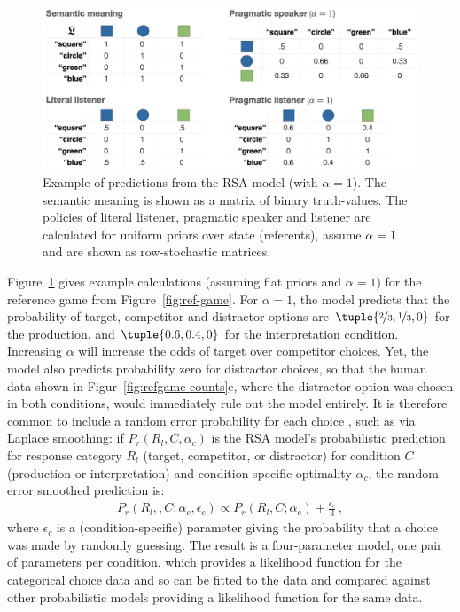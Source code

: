 \documentclass[fleqn]{article}
\begin{document}
\begin{figure}
  \centering
  \includegraphics[width = 0.9 \textwidth]{00-pics/RSA-example.png}
  \caption{
    Example of predictions from the RSA model (with $\alpha=1$).
    The semantic meaning is shown as a matrix of binary truth-values.
    The policies of literal listener, pragmatic speaker and listener are calculated for uniform priors over state (referents), assume $\alpha=1$ and are shown as row-stochastic matrices.
  }
  \label{fig:RSA-example}
\end{figure}

Figure~\ref{fig:RSA-example} gives example calculations (assuming flat priors and $\alpha=1$) for the reference game from Figure~\ref{fig:ref-game}.
For $\alpha=1$, the model predicts that the probability of target, competitor and distractor options are $\tuple{\nicefrac{2}{3}, \nicefrac{1}{3}, 0}$ for the production, and $\tuple{0.6, 0.4, 0}$ for the interpretation condition.
Increasing $\alpha$ will increase the odds of target over competitor choices.
Yet, the model also predicts probability zero for distractor choices, so that the human data shown in Figur~\ref{fig:refgame-counts}e, where the distractor option was chosen in both conditions, would immediately rule out the model entirely.
It is therefore common to include a random error probability for each choice \citep[e.g.,][]{LeeWagenmakers2013:Bayesian-Cognit}, such as via Laplace smoothing: if $P_{r}(R_{l}, C, \alpha_{c})$ is the RSA model's probabilistic prediction for response category $R_{l}$ (target, competitor, or distractor) for condition $C$ (production or interpretation) and condition-specific optimality $\alpha_{c}$, the random-error smoothed prediction is:
\begin{align*}
  P_{r}(R_{l}, , C; \alpha_{c}, \epsilon_{c}) \propto P_{r}(R_{l}, C; \alpha_{c}) +  \frac{\epsilon_{c}}{3}\,,
\end{align*}
where $\epsilon_{c}$ is a (condition-specific) parameter giving the probability that a choice was made by randomly guessing.
The result is a four-parameter model, one pair of parameters per condition, which provides a likelihood function for the categorical choice data and so can be fitted to the data and compared against other probabilistic models providing a likelihood function for the same data.
\end{document}
